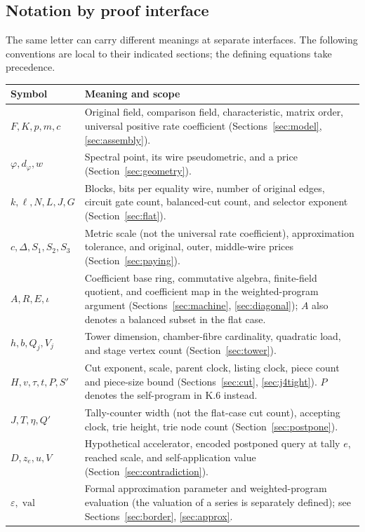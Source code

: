\documentclass[11pt,letterpaper]{article}
\theoremstyle{definition}\newtheorem{definition}[theorem]{Definition}\newtheorem{example}[theorem]{Example}
\theoremstyle{remark}\newtheorem{remark}[theorem]{Remark}
\begin{document}
\subsection{Notation by proof interface}\label{sec:notation}
The same letter can carry different meanings at separate interfaces. The following conventions are local to their indicated sections; the defining equations take precedence.
\begin{center}\small
\begin{tabular}{@{}p{.23\linewidth}p{.67\linewidth}@{}}\toprule
Symbol & Meaning and scope \\\midrule
$F,K,p,m,c$ & Original field, comparison field, characteristic, matrix order, universal positive rate coefficient (Sections~\ref{sec:model}, \ref{sec:assembly}).\\
$\varphi,d_\varphi,w$ & Spectral point, its wire pseudometric, and a price (Section~\ref{sec:geometry}).\\
$k,\ell,N,L,J,G$ & Blocks, bits per equality wire, number of original edges, circuit gate count, balanced-cut count, and selector exponent (Section~\ref{sec:flat}).\\
$c,\Delta,S_1,S_2,S_3$ & Metric scale (not the universal rate coefficient), approximation tolerance, and original, outer, middle-wire prices (Section~\ref{sec:paying}).\\
$A,R,E,\iota$ & Coefficient base ring, commutative algebra, finite-field quotient, and coefficient map in the weighted-program argument (Sections~\ref{sec:machine}, \ref{sec:diagonal}); $A$ also denotes a balanced subset in the flat case.\\
$h,b,Q_j,V_j$ & Tower dimension, chamber-fibre cardinality, quadratic load, and stage vertex count (Section~\ref{sec:tower}).\\
$H,v,\tau,t,P,S'$ & Cut exponent, scale, parent clock, listing clock, piece count and piece-size bound (Sections~\ref{sec:cut}, \ref{sec:j4tight}). $P$ denotes the self-program in K.6 instead.\\
$J,T,\eta,Q'$ & Tally-counter width (not the flat-case cut count), accepting clock, trie height, trie node count (Section~\ref{sec:postpone}).\\
$D,z_e,u,V$ & Hypothetical accelerator, encoded postponed query at tally $e$, reached scale, and self-application value (Section~\ref{sec:contradiction}).\\
$\varepsilon,\operatorname{val}$ & Formal approximation parameter and weighted-program evaluation (the valuation of a series is separately defined); see Sections~\ref{sec:border}, \ref{sec:approx}.\\
\bottomrule\end{tabular}
\end{center}
\end{document}
